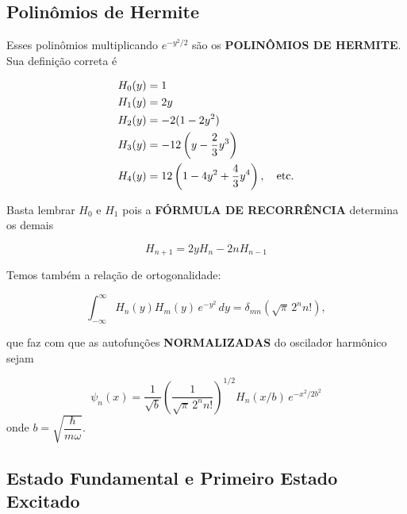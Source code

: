 \subsection*{Polinômios de Hermite}

Esses polinômios multiplicando $e^{-y^2/2}$ são os \textbf{POLINÔMIOS DE HERMITE}. Sua definição correta é

\begin{align}
    H_0(y) &= 1 \notag \\
    H_1(y) &= 2y \notag \\
    H_2(y) &= -2(1-2y^2) \notag \\
    H_3(y) &= -12\left(y - \frac{2}{3}y^3\right) \notag \\
    H_4(y) &= 12\left(1 - 4y^2 + \frac{4}{3}y^4\right), \quad \text{etc.}
\label{eq:aula16_hermite_lista}
\end{align}

Basta lembrar $H_0$ e $H_1$ pois a \textbf{FÓRMULA DE RECORRÊNCIA} determina os demais

\begin{equation}
    \boxed{H_{n+1} = 2y H_n - 2n H_{n-1}}
\label{eq:aula16_hermite_recorrencia}
\end{equation}

Temos também a relação de ortogonalidade:

\begin{equation}
    \int_{-\infty}^{\infty} H_n(y) H_m(y)\, e^{-y^2}\, dy = \delta_{mn}\left(\sqrt{\pi}\,2^n n!\right),
\label{eq:aula16_hermite_ortogonalidade}
\end{equation}

que faz com que as autofunções \textbf{NORMALIZADAS} do oscilador harmônico sejam

\begin{equation}
    \boxed{\psi_n(x) = \frac{1}{\sqrt{b}}\left(\frac{1}{\sqrt{\pi}\,2^n n!}\right)^{1/2} H_n(x/b)\, e^{-x^2/2b^2}}
\label{eq:aula16_autofuncoes_normalizadas}
\end{equation}
onde $b = \sqrt{\dfrac{\hbar}{m\omega}}$.

\subsection*{Estado Fundamental e Primeiro Estado Excitado}

